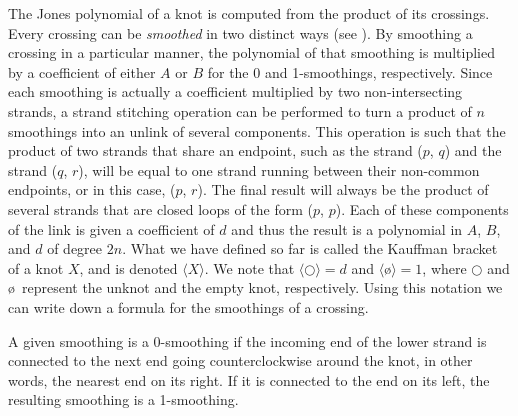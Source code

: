 \begin{paper}
The Jones polynomial of a knot is computed from the product of its crossings.
Every crossing can be \textit{smoothed} in two distinct ways (see
\figSmoothings).
By smoothing a crossing in a particular manner, the polynomial of that smoothing
is multiplied by a coefficient of either $A$ or $B$ for the 0 and 1-smoothings,
respectively.
Since each smoothing is actually a coefficient multiplied by two
non-intersecting strands, a strand stitching operation can be performed to turn
a product of $n$ smoothings into an unlink of several components.
This operation is such that the product of two strands that share an endpoint,
such as the strand ($p$, $q$) and the strand ($q$, $r$), will be equal to one
strand running between their non-common endpoints, or in this case, ($p$, $r$).
The final result will always be the product of several strands that are closed
loops of the form ($p$, $p$).
Each of these components of the link is given a coefficient of $d$ and thus the
result is a polynomial in $A$, $B$, and $d$ of degree $2n$.
What we have defined so far is called the Kauffman bracket of a knot $X$, and is
denoted $\langle X\rangle$.
We note that $\langle\bigcirc\rangle=d$ and $\langle$\o$\rangle=1$, where
$\bigcirc$ and \o~represent the unknot and the empty knot, respectively.
Using this notation we can write down a formula for the smoothings of a
crossing.


A given smoothing is a 0-smoothing if the incoming end of the lower strand is
connected to the next end going counterclockwise around the knot, in other
words, the nearest end on its right.
If it is connected to the end on its left, the resulting smoothing is a
1-smoothing.


\end{paper}
